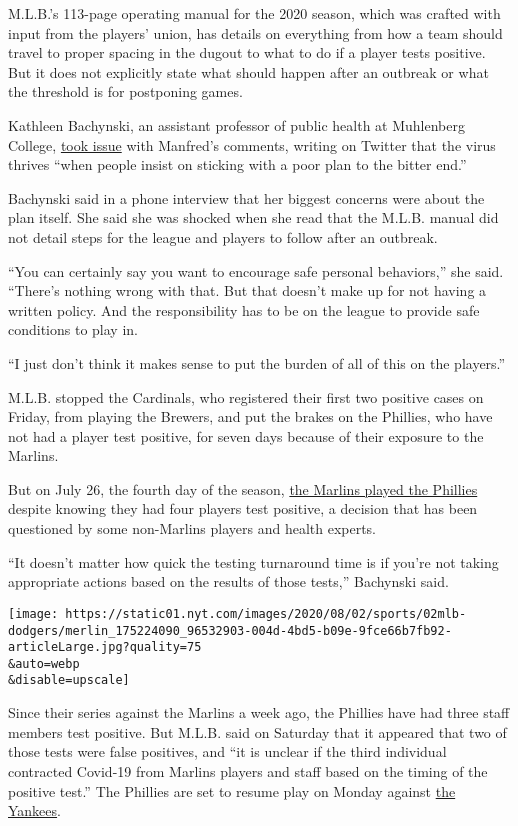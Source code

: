 M.L.B.'s 113-page operating manual for the 2020 season, which was
crafted with input from the players' union, has details on everything
from how a team should travel to proper spacing in the dugout to what to
do if a player tests positive. But it does not explicitly state what
should happen after an outbreak or what the threshold is for postponing
games.

Kathleen Bachynski, an assistant professor of public health at
Muhlenberg College,
\href{https://twitter.com/bachyns/status/1289665507117772800}{took
issue} with Manfred's comments, writing on Twitter that the virus
thrives ``when people insist on sticking with a poor plan to the bitter
end.''

Bachynski said in a phone interview that her biggest concerns were about
the plan itself. She said she was shocked when she read that the M.L.B.
manual did not detail steps for the league and players to follow after
an outbreak.

``You can certainly say you want to encourage safe personal behaviors,''
she said. ``There's nothing wrong with that. But that doesn't make up
for not having a written policy. And the responsibility has to be on the
league to provide safe conditions to play in.

``I just don't think it makes sense to put the burden of all of this on
the players.''

M.L.B. stopped the Cardinals, who registered their first two positive
cases on Friday, from playing the Brewers, and put the brakes on the
Phillies, who have not had a player test positive, for seven days
because of their exposure to the Marlins.

But on July 26, the fourth day of the season,
\href{https://www.nytimes.com/2020/07/27/sports/baseball/marlins-game-canceled.html}{the
Marlins played the Phillies} despite knowing they had four players test
positive, a decision that has been questioned by some non-Marlins
players and health experts.

``It doesn't matter how quick the testing turnaround time is if you're
not taking appropriate actions based on the results of those tests,''
Bachynski said.

\texttt{[image: https://static01.nyt.com/images/2020/08/02/sports/02mlb-dodgers/merlin\_175224090\_96532903-004d-4bd5-b09e-9fce66b7fb92-articleLarge.jpg?quality=75\\\&auto=webp\\\&disable=upscale]}

Since their series against the Marlins a week ago, the Phillies have had
three staff members test positive. But M.L.B. said on Saturday that it
appeared that two of those tests were false positives, and ``it is
unclear if the third individual contracted Covid-19 from Marlins players
and staff based on the timing of the positive test.'' The Phillies are
set to resume play on Monday against
\href{https://www.nytimes.com/2020/07/29/sports/baseball/yankees-schedule.html}{the
Yankees}.

